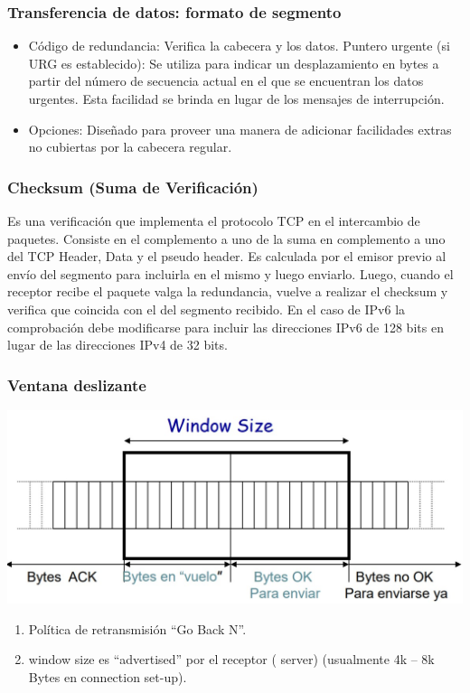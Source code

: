 \documentclass{beamer}
\begin{document}
\begin{frame}
\frametitle{Transferencia de datos: formato de segmento}
\begin{itemize}
\item Código de redundancia: Verifica la cabecera y los datos.
Puntero urgente (si URG es establecido): Se utiliza para indicar un desplazamiento en bytes a partir del número de secuencia actual en el que se encuentran los datos urgentes. Esta facilidad se brinda en lugar de los mensajes de interrupción.
\item Opciones: Diseñado para proveer una manera de adicionar facilidades extras no cubiertas por la cabecera regular.
\end{itemize}
\end{frame}

\begin{frame}
\frametitle{Checksum (Suma de Verificación)}
Es una verificación que implementa el protocolo TCP en el intercambio de paquetes.
Consiste en el complemento a uno de la suma en complemento a uno del TCP Header, Data y el pseudo header.
Es calculada por el emisor previo al envío del segmento para incluirla en el mismo y luego enviarlo. Luego, cuando el receptor recibe el paquete valga la redundancia, vuelve a realizar el checksum y verifica que coincida con el del segmento recibido.
En el caso de IPv6 la comprobación debe modificarse para incluir las direcciones IPv6 de 128 bits en lugar de las direcciones IPv4 de 32 bits.
\end{frame}

\begin{frame}
	\frametitle{Ventana deslizante}
	\includegraphics[width=\textwidth]{ventdesl}
	\begin{enumerate}
		\item Política de retransmisión “Go Back N”.
		\item window size es “advertised” por el receptor ( server)
		(usualmente 4k – 8k Bytes en connection set-up).
	\end{enumerate}
\end{frame}
\end{document}
